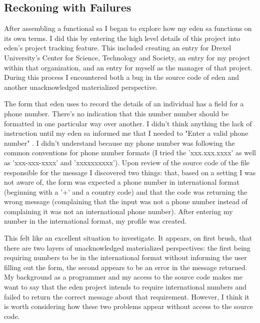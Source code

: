 \documentclass[a4paper,man,natbib,floatsintext]{apa6}
\begin{document}
   \subsection*{Reckoning with Failures}
   After assembling a functional \gls{sa} I began to explore how my \acrshort{eden} \gls{sa} functions on its own terms. I did this by entering the high level details of this project into \acrshort{eden}'s project tracking feature. This included creating an entry for Drexel University's Center for Science, Technology and Society, an entry for my project within that organization, and an entry for myself as the manager of that project. During this process I encountered both a bug in the source code of \acrshort{eden} and another unacknowledged materialized perspective. 

   The form that \acrshort{eden} uses to record the details of an individual has a field for a phone number. There's no indication that this number number should be formatted in one particular way over another. I didn't think anything the lack of instruction until my \acrshort{eden} \gls{sa} informed me that I needed to "Enter a valid phone number" \citep{Konig2020-yx}. I didn't understand because my phone number was following the common conventions for phone number formats (I tried the 'xxx.xxx.xxxx' as well as 'xxx-xxx-xxxx' and 'xxxxxxxxxx'). Upon review of the source code of the file responsible for the message I discovered two things: that, based on a setting I was not aware of, the form was expected a phone number in international format (beginning with a '+' and a country code) and that the code was returning the wrong message (complaining that the input was not a phone number instead of complaining it was not an international phone number). After entering my number in the international format, my profile was created.

   This felt like an excellent situation to investigate. It appears, on first brush, that there are two layers of unacknowledged materialized perspectives: the first being requiring numbers to be in the international format without informing the user filling out the form, the second appears to be an error in the message returned. My background as a programmer and my access to the source code makes me want to say that the \acrshort{eden} project intends to require international numbers and failed to return the correct message about that requirement. However, I think it is worth considering how these two problems appear without access to the source code.
\end{document}
